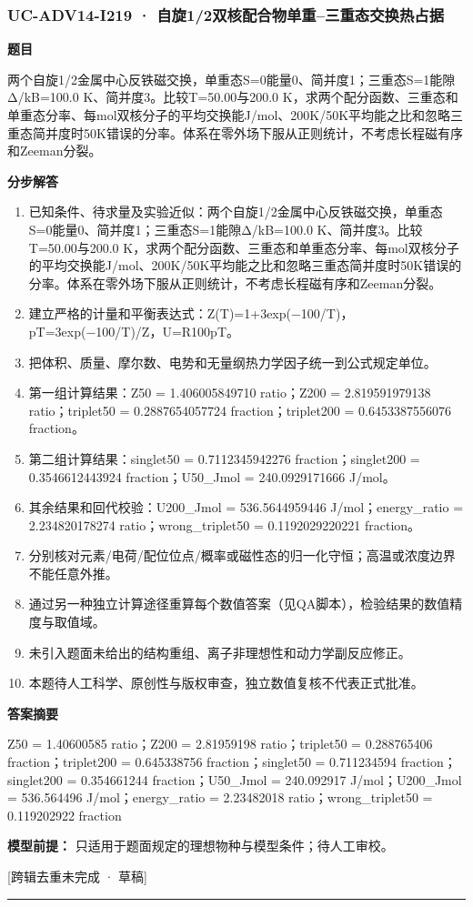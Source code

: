 \documentclass[UTF8,11pt,a4paper]{ctexart}
\begin{document}
\subsubsection*{UC-ADV14-I219 · 自旋1/2双核配合物单重–三重态交换热占据}
\noindent\textbf{题目}\par
两个自旋1/2金属中心反铁磁交换，单重态S=0能量0、简并度1；三重态S=1能隙Δ/kB=100.0 K、简并度3。比较T=50.00与200.0 K，求两个配分函数、三重态和单重态分率、每mol双核分子的平均交换能J/mol、200K/50K平均能之比和忽略三重态简并度时50K错误的分率。体系在零外场下服从正则统计，不考虑长程磁有序和Zeeman分裂。\par
\medskip\noindent\textbf{分步解答}
\begin{enumerate}
\item 已知条件、待求量及实验近似：两个自旋1/2金属中心反铁磁交换，单重态S=0能量0、简并度1；三重态S=1能隙Δ/kB=100.0 K、简并度3。比较T=50.00与200.0 K，求两个配分函数、三重态和单重态分率、每mol双核分子的平均交换能J/mol、200K/50K平均能之比和忽略三重态简并度时50K错误的分率。体系在零外场下服从正则统计，不考虑长程磁有序和Zeeman分裂。
\item 建立严格的计量和平衡表达式：Z(T)=1+3exp(−100/T)，pT=3exp(−100/T)/Z，U=R100pT。
\item 把体积、质量、摩尔数、电势和无量纲热力学因子统一到公式规定单位。
\item 第一组计算结果：Z50 = 1.406005849710 ratio；Z200 = 2.819591979138 ratio；triplet50 = 0.2887654057724 fraction；triplet200 = 0.6453387556076 fraction。
\item 第二组计算结果：singlet50 = 0.7112345942276 fraction；singlet200 = 0.3546612443924 fraction；U50\_Jmol = 240.0929171666 J/mol。
\item 其余结果和回代校验：U200\_Jmol = 536.5644959446 J/mol；energy\_ratio = 2.234820178274 ratio；wrong\_triplet50 = 0.1192029220221 fraction。
\item 分别核对元素/电荷/配位位点/概率或磁性态的归一化守恒；高温或浓度边界不能任意外推。
\item 通过另一种独立计算途径重算每个数值答案（见QA脚本），检验结果的数值精度与取值域。
\item 未引入题面未给出的结构重组、离子非理想性和动力学副反应修正。
\item 本题待人工科学、原创性与版权审查，独立数值复核不代表正式批准。
\end{enumerate}
\noindent\textbf{答案摘要}\par
Z50 = 1.40600585 ratio；Z200 = 2.81959198 ratio；triplet50 = 0.288765406 fraction；triplet200 = 0.645338756 fraction；singlet50 = 0.711234594 fraction；singlet200 = 0.354661244 fraction；U50\_Jmol = 240.092917 J/mol；U200\_Jmol = 536.564496 J/mol；energy\_ratio = 2.23482018 ratio；wrong\_triplet50 = 0.119202922 fraction\par
\noindent\textbf{模型前提：}
只适用于题面规定的理想物种与模型条件；待人工审校。\par
\noindent\textcolor{red!65!black}{[跨辑去重未完成 · 草稿]} \par
\medskip\hrule\medskip
{}
\end{document}
